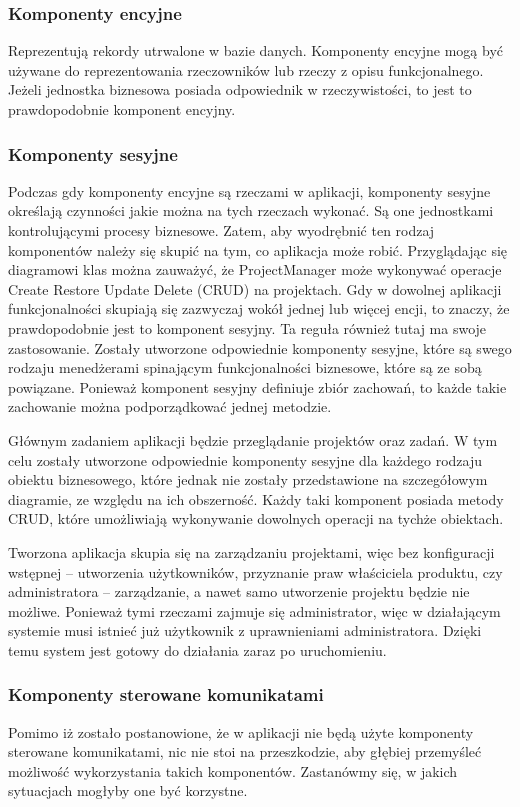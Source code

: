 \subsubsection{Komponenty encyjne}
Reprezentują rekordy utrwalone w bazie danych. Komponenty encyjne mogą być używane do reprezentowania rzeczowników lub rzeczy z opisu funkcjonalnego. Jeżeli jednostka biznesowa posiada odpowiednik w rzeczywistości, to jest to prawdopodobnie komponent encyjny.

\subsubsection{Komponenty sesyjne}
Podczas gdy komponenty encyjne są rzeczami w aplikacji, komponenty sesyjne określają czynności jakie można na tych rzeczach wykonać. Są one jednostkami kontrolującymi procesy biznesowe. Zatem, aby wyodrębnić ten rodzaj komponentów należy się skupić na tym, co aplikacja może robić.
Przyglądając się diagramowi klas można zauważyć, że ProjectManager może wykonywać operacje Create Restore Update Delete (CRUD) na projektach.
Gdy w dowolnej aplikacji funkcjonalności skupiają się zazwyczaj wokół jednej lub więcej encji, to znaczy, że prawdopodobnie jest to komponent sesyjny. Ta reguła również tutaj ma swoje zastosowanie. Zostały utworzone odpowiednie komponenty sesyjne, które są swego rodzaju menedżerami spinającym funkcjonalności biznesowe, które są ze sobą powiązane. Ponieważ komponent sesyjny definiuje zbiór zachowań, to każde takie zachowanie można podporządkować jednej metodzie.

Głównym zadaniem aplikacji będzie przeglądanie projektów oraz zadań. W tym celu zostały utworzone odpowiednie komponenty sesyjne dla każdego rodzaju obiektu biznesowego, które jednak nie zostały przedstawione na szczegółowym diagramie, ze względu na ich obszerność. Każdy taki komponent posiada metody CRUD, które umożliwiają wykonywanie dowolnych operacji na tychże obiektach.

Tworzona aplikacja skupia się na zarządzaniu projektami, więc bez konfiguracji wstępnej – utworzenia użytkowników, przyznanie praw właściciela produktu, czy administratora  – zarządzanie, a nawet samo utworzenie projektu będzie nie możliwe. Ponieważ tymi rzeczami zajmuje się administrator, więc w działającym systemie musi istnieć już użytkownik z uprawnieniami administratora. Dzięki temu system jest gotowy do działania zaraz po uruchomieniu.

\subsubsection{Komponenty sterowane komunikatami}
Pomimo iż zostało postanowione, że w aplikacji nie będą użyte komponenty sterowane komunikatami, nic nie stoi na przeszkodzie, aby głębiej przemyśleć możliwość wykorzystania takich komponentów. Zastanówmy się, w jakich sytuacjach mogłyby one być korzystne.

